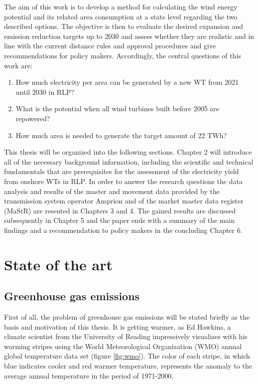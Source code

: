 \documentclass[a4paper,11pt]{article}
\begin{document}
The aim of this work is to develop a method for calculating the wind energy potential and its related area consumption at a state level regarding the two described options. The objective is then to evaluate the desired expansion and emission reduction targets up to 2030 and assess whether they are realistic and in line with the current distance rules and approval procedures and give recommendations for policy makers. Accordingly, the central questions of this work are:
\begin{enumerate}
\def\labelenumi{\arabic{enumi}.}
\item
  How much electricity per area can be generated by a new WT from 2021 until 2030 in RLP?
\item
  What is the potential when all wind turbines built before 2005 are repowered?
\item
  How much area is needed to generate the target amount of 22 TWh?
\end{enumerate}
This thesis will be organized into the following sections. Chapter 2 will introduce all of the necessary background information, including the scientific and technical fundamentals that are prerequisites for the assessment of the electricity yield from onshore WTs in RLP. In order to answer the research questions the data analysis and results of the master and movement data provided by the transmission system operator Amprion and of the market master data register (MaStR) are resented in Chapters 3 and 4. The gained results are discussed subsequently in Chapter 5 and the paper ends with a summary of the main findings and a recommendation to policy makers in the concluding Chapter 6.

\newpage

\hypertarget{state-of-the-art}{%
\section{State of the art}\label{state-of-the-art}}

\hypertarget{greenhouse-gas-emissions}{%
\subsection{Greenhouse gas emissions}\label{greenhouse-gas-emissions}}

First of all, the problem of greenhouse gas emissions will be stated briefly as the basis and motivation of this thesis. It is getting warmer, as Ed Hawkins, a climate scientist from the University of Reading impressively visualizes with his warming stripes using the World Meteorological Organization (WMO) annual global temperature data set (figure \ref{fig:wmo}). The color of each stripe, in which blue indicates cooler and red warmer temperature, represents the anomaly to the average annual temperature in the period of 1971-2000.
\end{document}
